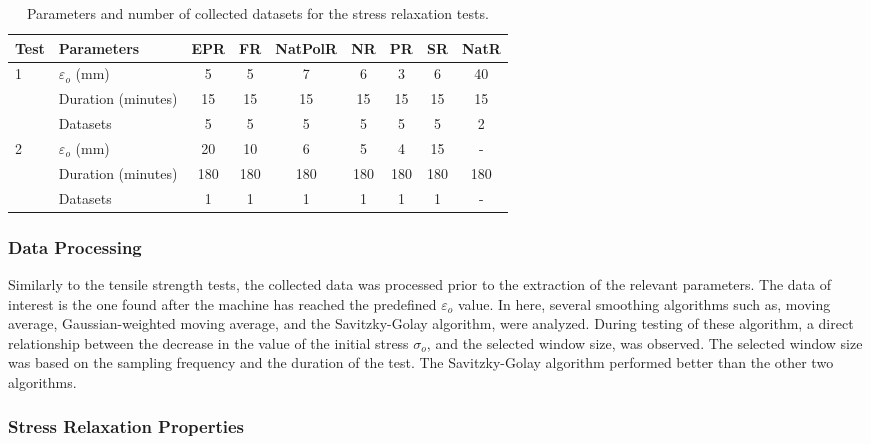 \begin{table*}[htb!]
\centering
\caption{Parameters and number of collected datasets for the stress relaxation tests.}
\label{tbl:stressRelParameters}
\begin{tabular}{llccccccc} \toprule
Test & Parameters & EPR & FR & NatPolR & NR & PR & SR & NatR \\
\hline
\multirow{3}{*}{1}  & $\varepsilon_o$ (mm)      & 5 & 5 & 7 & 6 & 3 & 6 & 40 \\
                    & Duration (minutes)    & 15 & 15 & 15 & 15 & 15 & 15 & 15 \\
                    & Datasets              & 5 & 5 & 5 & 5 & 5 & 5 & 2 \\
\hline 
\multirow{3}{*}{2}  & $\varepsilon_o$ (mm)      & 20 & 10 & 6 & 5 & 4 & 15 & - \\
                    & Duration (minutes)    & 180 & 180 & 180 & 180 & 180 & 180 & 180 \\
                    & Datasets              & 1 & 1 & 1 & 1 & 1 & 1 & - \\
\bottomrule
\end{tabular}
\end{table*}

\subsubsection{Data Processing}

Similarly to the tensile strength tests, the collected data was processed prior to the extraction of the relevant parameters. The data of interest is the one found after the machine has reached the predefined $\varepsilon_o$ value. In here, several smoothing algorithms such as, moving average, Gaussian-weighted moving average, and the Savitzky-Golay algorithm, were analyzed. During testing of these algorithm, a direct relationship between the decrease in the value of the initial stress $\sigma_o$, and the selected window size, was observed. The selected window size was based on the sampling frequency and the duration of the test. The Savitzky-Golay algorithm performed better than the other two algorithms.

\subsubsection{Stress Relaxation Properties}

